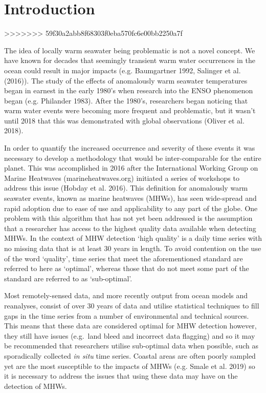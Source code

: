 \documentclass[]{article}
\begin{document}
\section{Introduction}\label{introduction}
>>>>>>> 59f30a2abb8f68303f0eba570fc6e00bb2250a7f

The idea of locally warm seawater being problematic is not a novel
concept. We have known for decades that seemingly transient warm water
occurrences in the ocean could result in major impacts (e.g. Baumgartner
1992, Salinger et al. (2016)). The study of the effects of anomalously
warm seawater temperatures began in earnest in the early 1980's when
research into the ENSO phenomenon began (e.g. Philander 1983). After the
1980's, researchers began noticing that warm water events were becoming
more frequent and problematic, but it wasn't until 2018 that this was
demonstrated with global observations (Oliver et al. 2018).

In order to quantify the increased occurrence and severity of these
events it was necessary to develop a methodology that would be
inter-comparable for the entire planet. This was accomplished in 2016
after the International Working Group on Marine Heatwaves
(marineheatwaves.org) initiated a series of workshops to address this
issue (Hobday et al. 2016). This definition for anomalously warm
seawater events, known as marine heatwaves (MHWs), has seen wide-spread
and rapid adoption due to ease of use and applicability to any part of
the globe. One problem with this algorithm that has not yet been
addressed is the assumption that a researcher has access to the highest
quality data available when detecting MHWs. In the context of MHW
detection `high quality' is a daily time series with no missing data
that is at least 30 years in length. To avoid contention on the use of
the word `quality', time series that meet the aforementioned standard
are referred to here as `optimal', whereas those that do not meet some
part of the standard are referred to as `sub-optimal'.

Most remotely-sensed data, and more recently output from ocean models
and reanalyses, consist of over 30 years of data and utilise statistical
techniques to fill gaps in the time series from a number of
environmental and technical sources. This means that these data are
considered optimal for MHW detection however, they still have issues
(e.g.~land bleed and incorrect data flagging) and so it may be
recommended that researchers utilise sub-optimal data when possible,
such as sporadically collected \emph{in situ} time series. Coastal areas
are often poorly sampled yet are the most susceptible to the impacts of
MHWs (e.g. Smale et al. 2019) so it is necessary to address the issues
that using these data may have on the detection of MHWs.
\end{document}
